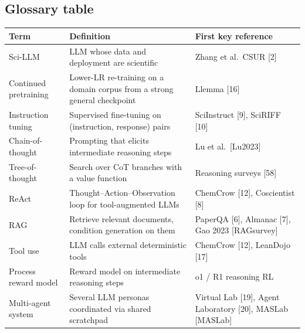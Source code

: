 \subsection{Glossary table}\label{glossary-table}

{\def\LTcaptype{none} %
\begin{longtable}[]{@{}
  >{\raggedright\arraybackslash}p{}
  >{\raggedright\arraybackslash}p{}
  >{\raggedright\arraybackslash}p{}@{}}
\toprule\noalign{}
\begin{minipage}[b]{\linewidth}\raggedright
Term
\end{minipage} & \begin{minipage}[b]{\linewidth}\raggedright
Definition
\end{minipage} & \begin{minipage}[b]{\linewidth}\raggedright
First key reference
\end{minipage} \\
\midrule\noalign{}
\endhead
\bottomrule\noalign{}
\endlastfoot
Sci-LLM & LLM whose data and deployment are scientific & Zhang et al.~CSUR {[}2{]} \\
Continued pretraining & Lower-LR re-training on a domain corpus from a strong general checkpoint & Llemma {[}16{]} \\
Instruction tuning & Supervised fine-tuning on (instruction, response) pairs & SciInstruct {[}9{]}, SciRIFF {[}10{]} \\
Chain-of-thought & Prompting that elicits intermediate reasoning steps & Lu et al.~{[}Lu2023{]} \\
Tree-of-thought & Search over CoT branches with a value function & Reasoning surveys {[}58{]} \\
ReAct & Thought--Action--Observation loop for tool-augmented LLMs & ChemCrow {[}12{]}, Coscientist {[}8{]} \\
RAG & Retrieve relevant documents, condition generation on them & PaperQA {[}6{]}, Almanac {[}7{]}, Gao 2023 {[}RAGsurvey{]} \\
Tool use & LLM calls external deterministic tools & ChemCrow {[}12{]}, LeanDojo {[}17{]} \\
Process reward model & Reward model on intermediate reasoning steps & o1 / R1 reasoning RL \\
Multi-agent system & Several LLM personas coordinated via shared scratchpad & Virtual Lab {[}19{]}, Agent Laboratory {[}20{]}, MASLab {[}MASLab{]} \\

\end{longtable}}
